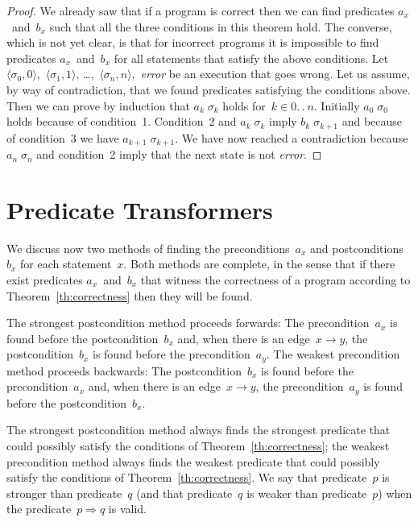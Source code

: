 \documentclass[a4paper]{article}
\newcommand{\limp}{\Rightarrow}
\theoremstyle{slanted}
\theoremstyle{definition}
\theoremstyle{remark}
\begin{document}
\begin{proof}
We already saw that if a program is correct then we
can find predicates $a_x$~and~$b_x$ such that all the
three conditions in this theorem hold. The converse,
which is not yet clear, is that for incorrect programs
it is impossible to find predicates $a_x$~and~$b_x$ for
all statements that satisfy the above conditions. Let
$\langle\sigma_0,0\rangle$,~$\langle\sigma_1,1\rangle$,
\dots,~$\langle\sigma_n,n\rangle$,~\textit{error} be an execution
that goes wrong. Let us assume, by way of contradiction, that we
found predicates satisfying the conditions above. Then we can
prove by induction that $a_k\;\sigma_k$ holds for~$k\in0.\,.\>n$.
Initially $a_0\;\sigma_0$ holds because of condition~1.
Condition~2 and $a_k\;\sigma_k$ imply $b_k\;\sigma_{k+1}$ and
because of condition~3 we have $a_{k+1}\;\sigma_{k+1}$. We
have now reached a contradiction because $a_n\;\sigma_n$ and
condition~2 imply that the next state is not \textit{error}.
\end{proof}
\section{Predicate Transformers}
\label{sec:predicate-transf}

We discuss now two methods of finding the preconditions~$a_x$
and postconditions~$b_x$ for each statement~$x$. Both methods
are complete, in the sense that if there exist predicates
$a_x$~and~$b_x$ that witness the correctness of a program
according to Theorem~\ref{th:correctness} then they will be
found.

The strongest postcondition method proceeds forwards: The
precondition~$a_x$ is found before the postcondition~$b_x$ and,
when there is an edge~$x\to y$, the postcondition~$b_x$ is found
before the precondition~$a_y$. The weakest precondition method
proceeds backwards: The postcondition~$b_x$ is found before the
precondition~$a_x$ and, when there is an edge~$x\to y$, the
precondition~$a_y$ is found before the postcondition~$b_x$.

The strongest postcondition method always finds the strongest
predicate that could possibly satisfy the conditions of
Theorem~\ref{th:correctness}; the weakest precondition method
always finds the weakest predicate that could possibly
satisfy the conditions of Theorem~\ref{th:correctness}. We
say that predicate~$p$ is stronger than predicate~$q$ (and
that predicate~$q$ is weaker than predicate~$p$) when the
predicate~$p\limp q$ is valid.
\end{document}
